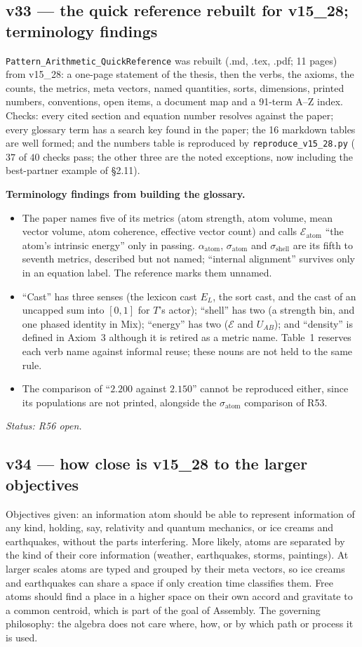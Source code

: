 \documentclass[11pt]{article}
\begin{document}
\subsection*{v33 --- the quick reference rebuilt for v15\_28; terminology findings}
\texttt{Pattern\_Arithmetic\_QuickReference} was rebuilt (.md, .tex, .pdf; 11
pages) from v15\_28: a one-page statement of the thesis, then the verbs, the
axioms, the counts, the metrics, meta vectors, named quantities, sorts,
dimensions, printed numbers, conventions, open items, a document map and a
91-term A--Z index. Checks: every cited section and equation number resolves
against the paper; every glossary term has a search key found in the paper;
the 16 markdown tables are well formed; and the numbers table is reproduced by
\texttt{reproduce\_v15\_28.py} ($37$ of $40$ checks pass; the other three are
the noted exceptions, now including the best-partner example of
\S2.11).

\textbf{Terminology findings from building the glossary.}
\begin{itemize}
\item The paper names five of its metrics (atom strength, atom volume, mean
vector volume, atom coherence, effective vector count) and calls
$\mathcal{E}_{\text{atom}}$ ``the atom's intrinsic energy'' only in passing.
$\alpha_{\text{atom}}$, $\sigma_{\text{atom}}$ and $\sigma_{\text{shell}}$ are
its fifth to seventh metrics, described but not named; ``internal alignment''
survives only in an equation label. The reference marks them unnamed.
\item ``Cast'' has three senses (the lexicon cast $E_L$, the sort cast, and the
cast of an uncapped sum into $[0,1]$ for $T$'s actor); ``shell'' has two (a
strength bin, and one phased identity in Mix); ``energy'' has two
($\mathcal{E}$ and $U_{AB}$); and ``density'' is defined in Axiom~3 although
it is retired as a metric name. Table~1 reserves each verb name against
informal reuse; these nouns are not held to the same rule.
\item The comparison of ``$2.200$ against $2.150$'' cannot be reproduced
either, since its populations are not printed, alongside the
$\sigma_{\text{atom}}$ comparison of R53.
\end{itemize}
\emph{Status: R56 open.}


\subsection*{v34 --- how close is v15\_28 to the larger objectives}
Objectives given: an information atom should be able to represent information
of any kind, holding, say, relativity and quantum mechanics, or ice creams and
earthquakes, without the parts interfering. More likely, atoms are separated by
the kind of their core information (weather, earthquakes, storms, paintings).
At larger scales atoms are typed and grouped by their meta vectors, so ice
creams and earthquakes can share a space if only creation time classifies
them. Free atoms should find a place in a higher space on their own accord and
gravitate to a common centroid, which is part of the goal of Assembly. The
governing philosophy: the algebra does not care where, how, or by which path or
process it is used.
\end{document}
